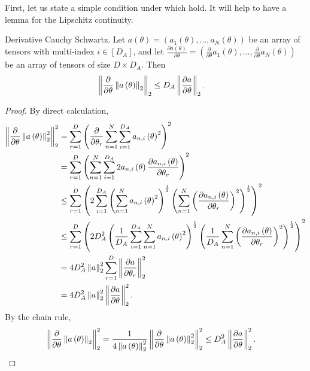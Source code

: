First, let us state a simple condition under which \coreassum
hold. It will help to have a lemma for the Lipschitz continuity.
\begin{lem}
Derivative Cauchy Schwartz. Let $a\left(\theta\right)=\left(a_{1}\left(\theta\right),...,a_{N}\left(\theta\right)\right)$
be an array of tensors with multi-index $i\in\left[D_{A}\right]$,
and let $\frac{\partial a\left(\theta\right)}{\partial\theta}=\left(\frac{\partial}{\partial\theta}a_{1}\left(\theta\right),...,\frac{\partial}{\partial\theta}a_{N}\left(\theta\right)\right)$
be an array of tensors of size $D\times D_{A}$. Then
\begin{align*}
\left\Vert \frac{\partial}{\partial\theta}\left\Vert a\left(\theta\right)\right\Vert_{2}\right\Vert_{2} & \le D_{A}\left\Vert \frac{\partial a}{\partial\theta}\right\Vert_{2}.
\end{align*}
\end{lem}
\begin{proof}
By direct calculation,
\begin{align*}
\left\Vert \frac{\partial}{\partial\theta}\left\Vert a\left(\theta\right)\right\Vert_{2}^{2}\right\Vert_{2}^{2} & =\sum_{r=1}^{D}\left(\frac{\partial}{\partial\theta_{r}}\sum_{n=1}^{N}\sum_{i=1}^{D_{A}}a_{n,i}\left(\theta\right)^{2}\right)^{2}\\
 & =\sum_{r=1}^{D}\left(\sum_{n=1}^{N}\sum_{i=1}^{D_{A}}2a_{n,i}\left(\theta\right)\frac{\partial a_{n,i}\left(\theta\right)}{\partial\theta_{r}}\right)^{2}\\
 & \le\sum_{r=1}^{D}\left(2\sum_{i=1}^{D_{A}}\left(\sum_{n=1}^{N}a_{n,i}\left(\theta\right)^{2}\right)^{\frac{1}{2}}\left(\sum_{n=1}^{N}\left(\frac{\partial a_{n,i}\left(\theta\right)}{\partial\theta_{r}}\right)^{2}\right)^{\frac{1}{2}}\right)^{2}\\
 & \le\sum_{r=1}^{D}\left(2D_{A}^{2}\left(\frac{1}{D_{A}}\sum_{i=1}^{D_{A}}\sum_{n=1}^{N}a_{n,i}\left(\theta\right)^{2}\right)^{\frac{1}{2}}\left(\frac{1}{D_{A}}\sum_{n=1}^{N}\left(\frac{\partial a_{n,i}\left(\theta\right)}{\partial\theta_{r}}\right)^{2}\right)^{\frac{1}{2}}\right)^{2}\\
 & =4D_{A}^{2}\left\Vert a\right\Vert_{2}^{2}\sum_{r=1}^{D}\left\Vert \frac{\partial a}{\partial\theta_{r}}\right\Vert_{2}^{2}\\
 & =4D_{A}^{2}\left\Vert a\right\Vert_{2}^{2}\left\Vert \frac{\partial a}{\partial\theta}\right\Vert_{2}^{2}.
\end{align*}
By the chain rule,
\begin{align*}
\left\Vert \frac{\partial}{\partial\theta}\left\Vert a\left(\theta\right)\right\Vert_{2}\right\Vert_{2}^{2} & =\frac{1}{4\left\Vert a\left(\theta\right)\right\Vert_{2}^{2}}\left\Vert \frac{\partial}{\partial\theta}\left\Vert a\left(\theta\right)\right\Vert_{2}^{2}\right\Vert_{2}^{2}\le D_{A}^{2}\left\Vert \frac{\partial a}{\partial\theta}\right\Vert_{2}^{2}.
\end{align*}
\end{proof}
